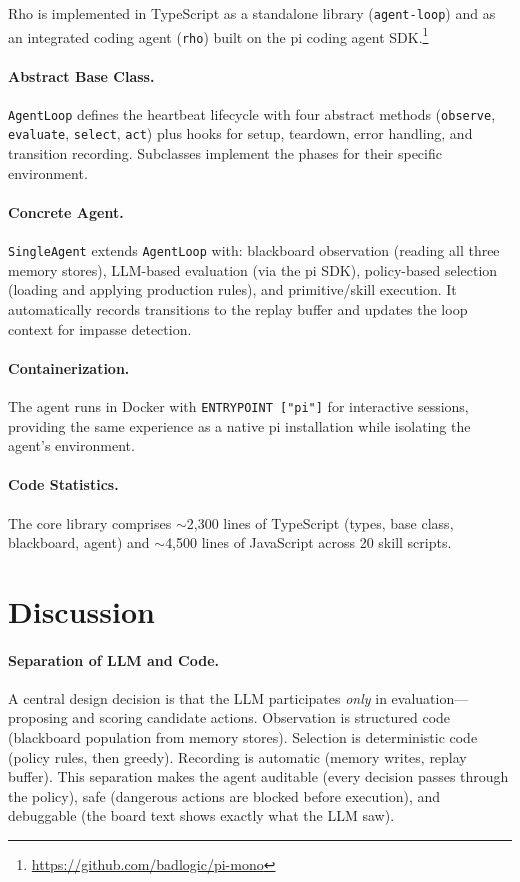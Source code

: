 \documentclass[letterpaper]{article}
\begin{document}
Rho is implemented in TypeScript as a standalone library (\texttt{agent-loop}) and as an integrated coding agent (\texttt{rho}) built on the pi coding agent SDK.\footnote{\url{https://github.com/badlogic/pi-mono}}

\paragraph{Abstract Base Class.} \texttt{AgentLoop} defines the heartbeat lifecycle with four abstract methods (\texttt{observe}, \texttt{evaluate}, \texttt{select}, \texttt{act}) plus hooks for setup, teardown, error handling, and transition recording. Subclasses implement the phases for their specific environment.

\paragraph{Concrete Agent.} \texttt{SingleAgent} extends \texttt{AgentLoop} with: blackboard observation (reading all three memory stores), LLM-based evaluation (via the pi SDK), policy-based selection (loading and applying production rules), and primitive/skill execution. It automatically records transitions to the replay buffer and updates the loop context for impasse detection.

\paragraph{Containerization.} The agent runs in Docker with \texttt{ENTRYPOINT ["pi"]} for interactive sessions, providing the same experience as a native pi installation while isolating the agent's environment.

\paragraph{Code Statistics.} The core library comprises ${\sim}$2,300 lines of TypeScript (types, base class, blackboard, agent) and ${\sim}$4,500 lines of JavaScript across 20 skill scripts.


\section{Discussion}

\paragraph{Separation of LLM and Code.}
A central design decision is that the LLM participates \emph{only} in evaluation---proposing and scoring candidate actions. Observation is structured code (blackboard population from memory stores). Selection is deterministic code (policy rules, then greedy). Recording is automatic (memory writes, replay buffer). This separation makes the agent auditable (every decision passes through the policy), safe (dangerous actions are blocked before execution), and debuggable (the board text shows exactly what the LLM saw).
\end{document}
